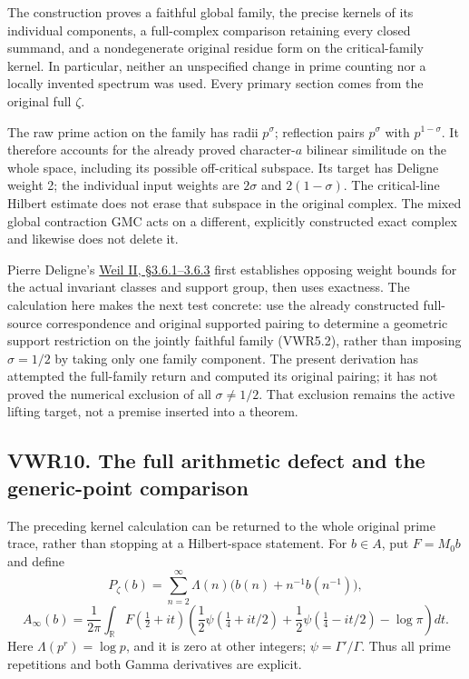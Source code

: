 The construction proves a faithful global family, the precise kernels of
its individual components, a full-complex comparison retaining every
closed summand, and a nondegenerate original residue form on the
critical-family kernel. In particular, neither an unspecified change in
prime counting nor a locally invented spectrum was used. Every primary
section comes from the original full \(\zeta\).

The raw prime action on the family has radii \(p^\sigma\); reflection
pairs \(p^\sigma\) with \(p^{1-\sigma}\). It therefore accounts for the
already proved character-\(a\) bilinear similitude on the whole space,
including its possible off-critical subspace. Its target has Deligne
weight 2; the individual input weights are \(2\sigma\) and
\(2(1-\sigma)\). The critical-line Hilbert estimate does not erase that
subspace in the original complex. The mixed global contraction GMC acts
on a different, explicitly constructed exact complex and likewise does
not delete it.

Pierre Deligne's
\href{https://www.numdam.org/item/PMIHES_1980__52__137_0/}{Weil II,
§3.6.1--3.6.3} first establishes opposing weight bounds for the actual
invariant classes and support group, then uses exactness. The
calculation here makes the next test concrete: use the already
constructed full-source correspondence and original supported pairing to
determine a geometric support restriction on the jointly faithful family
(VWR5.2), rather than imposing \(\sigma=1/2\) by taking only one family
component. The present derivation has attempted the full-family return
and computed its original pairing; it has not proved the numerical
exclusion of all \(\sigma\ne1/2\). That exclusion remains the active
lifting target, not a premise inserted into a theorem.

\subsection{VWR10. The full arithmetic defect and the generic-point
comparison}\label{vwr10.-the-full-arithmetic-defect-and-the-generic-point-comparison}

The preceding kernel calculation can be returned to the whole original
prime trace, rather than stopping at a Hilbert-space statement. For
\(b\in A\), put \(F=M_0b\) and define \[
P_\zeta(b)=\sum_{n=2}^{\infty}\Lambda(n)
 \bigl(b(n)+n^{-1}b(n^{-1})\bigr),
\] \[
A_\infty(b)=\frac1{2\pi}\int_{\mathbb R}F(\tfrac12+it)
 \left(\frac12\psi(\tfrac14+it/2)+\frac12\psi(\tfrac14-it/2)-\log\pi\right)dt.
\tag{VWR10.1}
\] Here \(\Lambda(p^r)=\log p\), and it is zero at other integers;
\(\psi=\Gamma'/\Gamma\). Thus all prime repetitions and both Gamma
derivatives are explicit.

